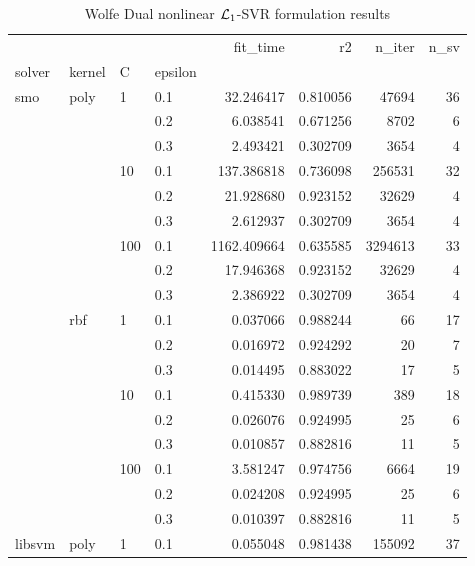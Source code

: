 \begin{table}[H]
\centering
\caption{Wolfe Dual nonlinear $\protect \mathcal{L}_1$-SVR formulation results}
\label{nonlinear_dual_l1_svr_cv_results}
\begin{tabular}{llllrrrr}
\toprule
       &     &     &     &     fit\_time &        r2 &    n\_iter &  n\_sv \\
solver & kernel & C & epsilon &              &           &           &       \\
\midrule
smo & poly & 1   & 0.1 &    32.246417 &  0.810056 &     47694 &    36 \\
       &     &     & 0.2 &     6.038541 &  0.671256 &      8702 &     6 \\
       &     &     & 0.3 &     2.493421 &  0.302709 &      3654 &     4 \\
       &     & 10  & 0.1 &   137.386818 &  0.736098 &    256531 &    32 \\
       &     &     & 0.2 &    21.928680 &  0.923152 &     32629 &     4 \\
       &     &     & 0.3 &     2.612937 &  0.302709 &      3654 &     4 \\
       &     & 100 & 0.1 &  1162.409664 &  0.635585 &   3294613 &    33 \\
       &     &     & 0.2 &    17.946368 &  0.923152 &     32629 &     4 \\
       &     &     & 0.3 &     2.386922 &  0.302709 &      3654 &     4 \\
       & rbf & 1   & 0.1 &     0.037066 &  0.988244 &        66 &    17 \\
       &     &     & 0.2 &     0.016972 &  0.924292 &        20 &     7 \\
       &     &     & 0.3 &     0.014495 &  0.883022 &        17 &     5 \\
       &     & 10  & 0.1 &     0.415330 &  0.989739 &       389 &    18 \\
       &     &     & 0.2 &     0.026076 &  0.924995 &        25 &     6 \\
       &     &     & 0.3 &     0.010857 &  0.882816 &        11 &     5 \\
       &     & 100 & 0.1 &     3.581247 &  0.974756 &      6664 &    19 \\
       &     &     & 0.2 &     0.024208 &  0.924995 &        25 &     6 \\
       &     &     & 0.3 &     0.010397 &  0.882816 &        11 &     5 \\
libsvm & poly & 1   & 0.1 &     0.055048 &  0.981438 &    155092 &    37 \\

\end{tabular}
\end{table}

